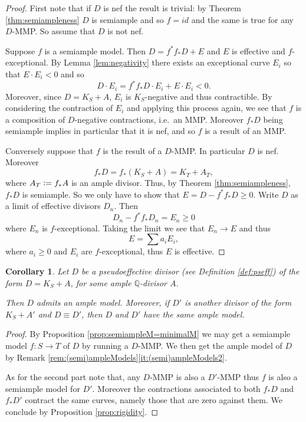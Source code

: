 \documentclass[a4paper,11pt]{amsart}
\newtheorem{corollary}[theorem]{Corollary}
\newcommand{\QQ}{\mathbb{Q}}
\newcommand{\defeq}{\vcentcolon=}
\begin{document}
\begin{proof}
	First note that if $D$ is nef the result is trivial: by Theorem \ref{thm:semiampleness} $D$ is semiample and so $f = id$ and the same is true for any $D$-MMP.
	So assume that $D$ is not nef.
	
	Suppose $f$ is a semiample model.
	Then $D = f^*f_*D + E$ and $E$ is effective and $f$-exceptional.
	By Lemma \ref{lem:negativity} there exists an exceptional curve $E_i$ so that $E\cdot E_i < 0$ and so 
	\[
	D \cdot E_i = f^*f_*D\cdot E_i  + E\cdot E_i < 0.
	\] 
	Moreover, since $D = K_S + A$, $E_i$ is $K_S$-negative and thus contractible.
	By considering the contraction of $E_i$ and applying this process again, we see that $f$ is a composition of $D$-negative contractions, i.e.\ an MMP.
	Moreover $f_*D$ being semiample implies in particular that it is nef, and so $f$ is a result of an MMP.
	
	Conversely suppose that $f$ is the result of a $D$-MMP.
	In particular $D$ is nef.
	Moreover
	\[
	f_*D = f_*(K_S + A) = K_T + A_T,
	\]
	where $A_T \defeq f_*A$ is an ample divisor.
	Thus, by Theorem \ref{thm:semiampleness}, $f_*D$ is semiample.
	So we only have to show that $E = D - f^*f_*D \geq 0$.
	Write $D$ as a limit of effective divisors $D_n$.
	Then
	\[
	D_n - f^*f_*D_n = E_n \geq 0
	\]
	where $E_n$ is $f$-exceptional.
	Taking the limit we see that $E_n \to E$ and thus 
	\[
	E = \sum a_iE_i,
	\]
	where $a_i \geq 0$ and $E_i$ are $f$-exceptional, thus $E$ is effective.
\end{proof}



\begin{corollary}\label{cor:adjointAdmitAmpleModels}
	Let $D$ be a pseudoeffective divisor (see Definition \ref{def:pseff}) of the form $D = K_S + A$, for some ample $\QQ$-divisor $A$.
	
	Then $D$ admits an ample model.
	Moreover, if $D'$ is another divisor of the form $K_S + A'$ and $D \equiv D'$, then $D$ and $D'$ have the same ample model.
\end{corollary}

\begin{proof}
	By Proposition \ref{prop:semiampleM=minimalM} we may get a semiample model $f\colon S \to T$ of $D$ by running a $D$-MMP.
	We then get the ample model of $D$ by Remark \ref{rem:(semi)ampleModels}\eqref{it:(semi)ampleModels2}.
	
	As for the second part note that, any $D$-MMP is also a $D'$-MMP thus $f$ is also a semiample model for $D'$.
	Moreover the contractions associated to both $f_*D$ and $f_*D'$ contract the same curves, namely those that are zero against them.
	We conclude by Proposition \ref{prop:rigidity}.
\end{proof}
\end{document}
